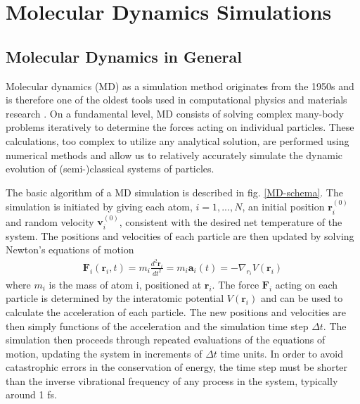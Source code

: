 \chapter{Molecular Dynamics Simulations}

\section{Molecular Dynamics in General}
Molecular dynamics (MD) as a simulation method originates from the 1950s and is therefore one of the oldest tools used in computational physics and materials research \cite{alder1957phase}.
On a fundamental level, MD consists of solving complex many-body problems iteratively to determine the forces acting on individual particles. These calculations, too complex  to utilize any analytical solution, are performed using numerical methods and allow us to relatively accurately simulate the dynamic evolution of (semi-)classical systems of particles. 

The basic algorithm of a MD simulation is described in fig. \ref{MD-schema}. The simulation is initiated by giving each atom, $i=1,...,N$, an initial position $\mathbf{r}_i^{(0)}$ and random velocity $\mathbf{v}_i^{(0)}$, consistent with the desired net temperature of the system. The positions and velocities of each particle are then updated by solving Newton's equations of motion
\begin{align}
\mathbf{F}_i(\mathbf{r}_i,t) = m_i\frac{d^2\mathbf{r}_i}{dt^2} = m_i\mathbf{a}_i(t) = -\nabla_{r_i}V(\mathbf{r}_i)
\end{align}
where $m_i$ is the mass of atom i, positioned at $\mathbf{r}_i$. The force $\mathbf{F}_i$ acting on each particle is determined by the interatomic potential $V(\mathbf{r}_i)$ and can be used to calculate the acceleration of each particle. The new positions and velocities are then simply functions of the acceleration and the simulation time step $\Delta t$. The simulation then proceeds through repeated evaluations of the equations of motion, updating the system in increments of $\Delta t$ time units. In order to avoid catastrophic errors in the conservation of energy, the time step must be shorter than the inverse vibrational frequency of any process in the system, typically around 1 fs. 

